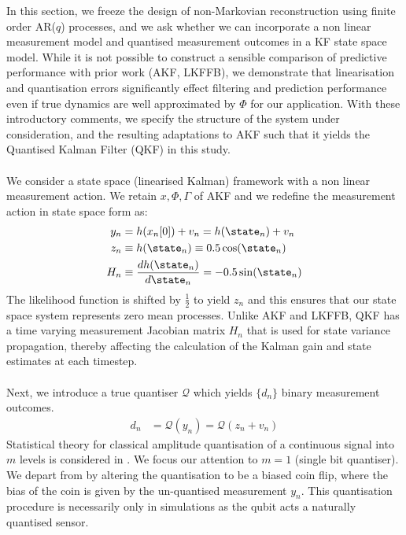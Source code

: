 In this section, we freeze the design of non-Markovian reconstruction using finite order AR($q$) processes, and we ask whether we can incorporate a non linear measurement model and quantised measurement outcomes in a KF state space model.  While it is not possible to construct a sensible comparison of predictive performance with prior work (AKF, LKFFB), we demonstrate that linearisation and quantisation errors significantly effect filtering and prediction performance even if true dynamics are well approximated by $\Phi$ for our application. With these introductory comments, we specify the structure of the system under consideration, and the resulting adaptations to AKF such that it yields the Quantised Kalman Filter (QKF) in this study.
\\
\\
We consider a state space (linearised Kalman) framework with a non linear measurement action. We retain $x, \Phi, \Gamma$ of AKF and we redefine the measurement action in state space form as:
\begin{align}
y_n &= h(x_n[0]) + v_n = h(\state_n) + v_n \\
z_n & \equiv  h(\state_n) \equiv  0.5\cos(\state_{n}) \\
H_n &\equiv \frac{d h(\state_n)}{d\state_n} =  -0.5\sin(\state_{n})
\end{align}
The likelihood function is shifted by $\frac{1}{2}$ to yield $z_n$ and this ensures that our state space system represents zero mean processes. Unlike AKF and LKFFB, QKF has a time varying measurement Jacobian matrix $H_n$ that is used for state variance propagation, thereby affecting the calculation of the Kalman gain and state estimates at each timestep.
\\
\\
Next, we introduce a true quantiser $\mathcal{Q}$ which yields $\{d_n\}$ binary measurement outcomes.  
\begin{align}
d_n &= \mathcal{Q}(y_n) = \mathcal{Q}(z_n + v_n) 
\end{align}
Statistical theory for classical amplitude quantisation of a continuous signal into $m$ levels is considered in \cite{karlsson2005}. We focus our attention to $m=1$ (single bit quantiser). We depart from \cite{karlsson2005} by altering the quantisation to be a biased coin flip, where the bias of the coin is given by the un-quantised measurement $y_n$. This quantisation procedure is necessarily only in simulations as the qubit acts a naturally quantised sensor.
